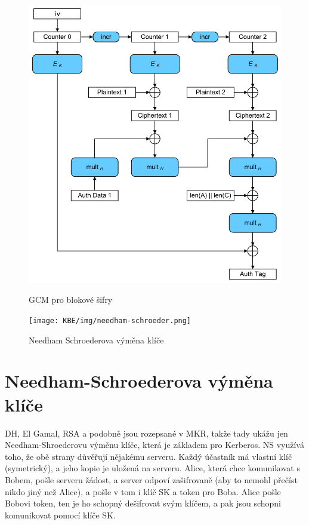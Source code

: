 \begin{figure}[ht!]
\centering
\begin{minipage}{.5\textwidth}
  \centering
  \includegraphics[width=\linewidth]{KBE/img/gcm.png}
  \caption{GCM pro blokové šifry}
  \label{fig:test1}
\end{minipage}%
\begin{minipage}{.5\textwidth}
  \centering
  \texttt{[image: KBE/img/needham-schroeder.png]}
  \caption{Needham Schroederova výměna klíče}
  \label{fig:test2}
\end{minipage}
\end{figure}


\section{Needham-Schroederova výměna klíče}

DH, El Gamal, RSA a podobně jsou rozepsané v MKR, takže tady ukážu jen Needham-Shroederovu výměnu klíče, která je základem pro Kerberos. NS využívá toho, že obě strany důvěřují nějakému serveru. Každý účastník má vlastní klíč (symetrický), a jeho kopie je uložená na serveru. Alice, která chce komunikovat s Bobem, pošle serveru žádost, a server odpoví zašifrovaně (aby to nemohl přečíst nikdo jiný než Alice), a pošle v tom i klíč SK a token pro Boba. Alice pošle Bobovi token, ten je ho schopný dešifrovat svým klíčem, a pak jsou schopni komunikovat pomocí klíče SK.

